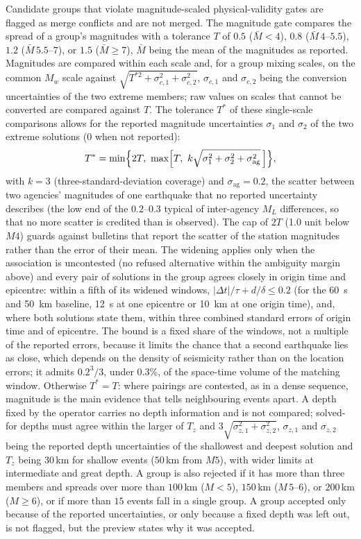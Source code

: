 \documentclass[12pt]{article}
\begin{document}
Candidate groups that violate magnitude-scaled physical-validity gates are
flagged as merge conflicts and are not merged.  The magnitude gate compares the
spread of a group's magnitudes with a tolerance $T$ of $0.5$ ($\bar{M}<4$),
$0.8$ ($\bar{M}\,4$--$5.5$), $1.2$ ($\bar{M}\,5.5$--$7$), or $1.5$
($\bar{M}\geq7$), $\bar{M}$ being the mean of the magnitudes as reported.
Magnitudes are compared within each scale and, for a group mixing scales, on the
common $M_w$ scale against $\sqrt{T^{*2} + \sigma_{c,1}^{2} + \sigma_{c,2}^{2}}$,
$\sigma_{c,1}$ and $\sigma_{c,2}$ being the conversion uncertainties of the two
extreme members; raw values on scales that cannot be converted are compared
against $T$.  The tolerance $T^{*}$ of these single-scale comparisons allows for
the reported magnitude uncertainties $\sigma_1$ and $\sigma_2$ of the two
extreme solutions ($0$ when not reported):
\begin{equation}
  T^{*} = \min\Bigl\{2T,\ \max\Bigl[T,\ k\sqrt{\sigma_1^{2} + \sigma_2^{2} + \sigma_{\mathrm{ag}}^{2}}\,\Bigr]\Bigr\},
  \label{eq:magtol}
\end{equation}
with $k = 3$ (three-standard-deviation coverage) and $\sigma_{\mathrm{ag}} = 0.2$,
the scatter between two agencies' magnitudes of one earthquake that no reported
uncertainty describes (the low end of the $0.2$--$0.3$ typical of inter-agency
$M_L$ differences, so that no more scatter is credited than is observed).  The
cap of $2T$ (1.0 unit below $M4$) guards against bulletins that report the
scatter of the station magnitudes rather than the error of their mean.  The
widening applies only when the association is uncontested (no refused
alternative within the ambiguity margin above) and every pair of solutions in
the group agrees closely in origin time and epicentre: within a fifth of its
widened windows, $|\Delta t|/\tau + d/\delta \leq 0.2$ (for the 60~s and 50~km
baseline, 12~s at one epicentre or 10~km at one origin time), and, where both
solutions state them, within three combined standard errors of origin time and
of epicentre.  The bound is a fixed share of the windows, not a multiple of the
reported errors, because it limits the chance that a second earthquake lies as
close, which depends on the density of seismicity rather than on the location
errors; it admits $0.2^{3}/3$, under 0.3\%, of the space-time volume of the
matching window.  Otherwise
$T^{*} = T$: where pairings are contested, as in a dense sequence, magnitude is
the main evidence that tells neighbouring events apart.  A depth fixed by the
operator carries no depth information and is not compared; solved-for depths
must agree within the larger of $T_z$ and
$3\sqrt{\sigma_{z,1}^{2} + \sigma_{z,2}^{2}}$, $\sigma_{z,1}$ and $\sigma_{z,2}$
being the reported depth uncertainties of the shallowest and deepest solution
and $T_z$ being $30$\,km for shallow events ($50$\,km from $M5$), with wider
limits at intermediate and great depth.  A group is also rejected if it has more
than three members and spreads over more than $100$\,km ($M<5$), $150$\,km
($M\,5$--$6$), or $200$\,km ($M\geq6$), or if more than $15$ events fall in a
single group.  A group accepted only because of the reported uncertainties, or
only because a fixed depth was left out, is not flagged, but the preview states
why it was accepted.
\end{document}
